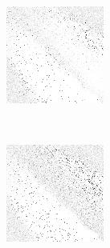 \begin{figure}
	\begin{subfigure}[t]{0.22\textwidth}
		\center
		\includegraphics[width=\textwidth]{images/findings/experiments/regularization/strats/0.70/crib_min_avg.png}
		\caption{\cribminavg}
	\end{subfigure}
	~
	\begin{subfigure}[t]{0.22\textwidth}
		\center
		\includegraphics[width=\textwidth]{images/findings/experiments/regularization/strats/0.70/pegging_max_avg_gained.png}

\end{subfigure}
\end{figure}
